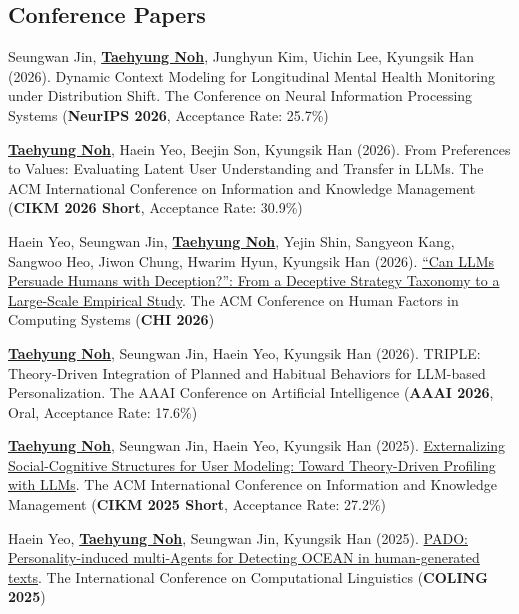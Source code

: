 \documentclass[a4paper,11pt]{article}
\begin{document}
\subsection*{\textbf{Conference Papers}}
\vspace{-2mm}
\small{
\begin{enumerate}[leftmargin=*, labelsep=0.5em, align=left, widest={[\textbf{C.1}]}, itemindent=0em, label={\textbf{[C.\arabic*]}}]

\item Seungwan Jin, \underline{\textbf{Taehyung Noh}}, Junghyun Kim, Uichin Lee, Kyungsik Han (2026). Dynamic Context Modeling for Longitudinal Mental Health Monitoring under Distribution Shift. The Conference on Neural Information Processing Systems (\textbf{NeurIPS 2026}, Acceptance Rate: 25.7\%)

\item \underline{\textbf{Taehyung Noh}}, Haein Yeo, Beejin Son, Kyungsik Han (2026). From Preferences to Values: Evaluating Latent User Understanding and Transfer in LLMs. The ACM International Conference on Information and Knowledge Management (\textbf{CIKM 2026 Short}, Acceptance Rate: 30.9\%)

\item Haein Yeo, Seungwan Jin, \underline{\textbf{Taehyung Noh}}, Yejin Shin, Sangyeon Kang, Sangwoo Heo, Jiwon Chung, Hwarim Hyun, Kyungsik Han (2026). \href{https://astlyi.s3.ap-northeast-2.amazonaws.com/2026/2026_CHI_Can_LLMs_Persuade_Humans_with_Deception.pdf}{``Can LLMs Persuade Humans with Deception?'': From a Deceptive Strategy Taxonomy to a Large-Scale Empirical Study}. The ACM Conference on Human Factors in Computing Systems (\textbf{CHI 2026})

\item \underline{\textbf{Taehyung Noh}}, Seungwan Jin, Haein Yeo, Kyungsik Han (2026). TRIPLE: Theory-Driven Integration of Planned and Habitual Behaviors for LLM-based Personalization. The AAAI Conference on Artificial Intelligence (\textbf{AAAI 2026}, Oral, Acceptance Rate: 17.6\%)

\item \underline{\textbf{Taehyung Noh}}, Seungwan Jin, Haein Yeo, Kyungsik Han (2025). \href{https://dl.acm.org/doi/10.1145/3746252.3760965}{Externalizing Social-Cognitive Structures for User Modeling: Toward Theory-Driven Profiling with LLMs}. The ACM International Conference on Information and Knowledge Management (\textbf{CIKM 2025 Short}, Acceptance Rate: 27.2\%)

\item Haein Yeo, \underline{\textbf{Taehyung Noh}}, Seungwan Jin, Kyungsik Han (2025). \href{https://aclanthology.org/2025.coling-main.382/}{PADO: Personality-induced multi-Agents for Detecting OCEAN in human-generated texts}. The International Conference on Computational Linguistics (\textbf{COLING 2025})


\end{enumerate}}
\end{document}
